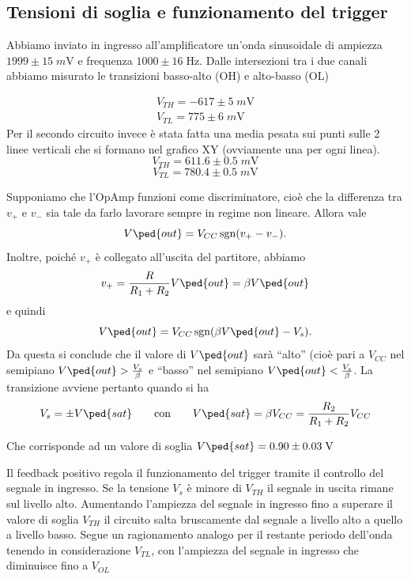 \documentclass[10pt,a4paper]{article}
\begin{document}
\subsection{Tensioni di soglia e funzionamento del trigger}
Abbiamo inviato in ingresso all'amplificatore un'onda sinusoidale di ampiezza
$1999 \pm 15 \; \si{m\V}$ e frequenza $1000 \pm 16 \; \si{\Hz}$.
Dalle intersezioni tra i due canali abbiamo misurato le transizioni basso-alto
(OH) e alto-basso (OL)

\begin{align*}
V_{TH} = -617 \pm 5 \; \si{m\V} \\
V_{TL} = 775 \pm 6 \; \si{m\V}
\end{align*}
Per il secondo circuito invece è stata fatta una media pesata sui punti sulle 2 linee verticali che si formano nel grafico XY (ovviamente una per ogni linea).
\[
V_{TH} = 611.6 \pm 0.5 \; \si{m\V}
\]
\[
V_{TL} = 780.4 \pm 0.5 \; \si{m\V}
\]

Supponiamo che l'OpAmp funzioni come discriminatore, cioè che la differenza tra $v_+ $ e $v_- $ sia tale da farlo lavorare sempre in regime non lineare. Allora vale
\[ V\ped{out} = V_{CC} \sgn(v_+ - v_-). \]
Inoltre, poiché $v_+ $ è collegato all'uscita del partitore, abbiamo
\[ v_+ = \frac{R}{R_1 + R_2} V \ped{out} = \beta V\ped{out} \]
e quindi
\[
V\ped{out} = V_{CC} \sgn(\beta V\ped{out} - V_s)
.\]
Da questa si conclude che il valore di $V\ped{out} $ sarà ``alto''
(cioè pari a $ V_{CC} $ nel semipiano $V\ped{out} > \frac{V_s}{\beta}$ e
``basso'' nel semipiano $ V \ped{out} < \frac{V_s}{\beta}$. La transizione
avviene pertanto quando si ha
\[
V_s = \pm V \ped{sat} \qquad\text{con}\qquad V \ped{sat} = \beta V_{CC} = \frac{R_2}{R_1 + R_2} V_{CC}
\]

Che corrisponde ad un valore di soglia $V\ped{sat} = 0.90 \pm 0.03 \; \si{\V}$

Il feedback positivo regola il funzionamento del trigger tramite il controllo del segnale in ingresso. Se la tensione $V_s$ è minore di $V_{TH}$ il segnale in uscita rimane sul livello alto. Aumentando l’ampiezza del segnale in ingresso fino a superare il valore di soglia $V_{TH}$ il circuito salta bruscamente dal segnale a livello alto a quello a livello basso. Segue un ragionamento analogo per il restante periodo dell’onda tenendo in considerazione $V_{TL}$, con l’ampiezza del segnale in ingresso che
diminuisce fino a $V_{OL}$
\end{document}
